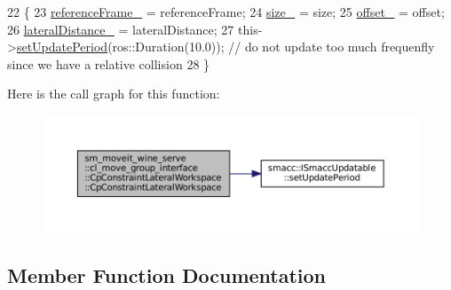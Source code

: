 \begin{DoxyCode}
22         \{
23             \hyperlink{classsm__moveit__wine__serve_1_1cl__move__group__interface_1_1CpConstraintLateralWorkspace_ae894b75a0860067b5a6bf372d77c6288}{referenceFrame\_} = referenceFrame;
24             \hyperlink{classsm__moveit__wine__serve_1_1cl__move__group__interface_1_1CpConstraintLateralWorkspace_ac86436171b9f9a7890c197b7ae1ab94b}{size\_} = size;
25             \hyperlink{classsm__moveit__wine__serve_1_1cl__move__group__interface_1_1CpConstraintLateralWorkspace_ac6bac0069cd6e3267af22bfc5c28ccb5}{offset\_} = offset;
26             \hyperlink{classsm__moveit__wine__serve_1_1cl__move__group__interface_1_1CpConstraintLateralWorkspace_ad907ce3091bcb999c40024c7049483ae}{lateralDistance\_} = lateralDistance;
27             this->\hyperlink{classsmacc_1_1ISmaccUpdatable_a88f3b092a81b2d8810a9776c8c69855b}{setUpdatePeriod}(ros::Duration(10.0)); \textcolor{comment}{// do not update too much frequenfly
       since we have a relative collision}
28         \}
\end{DoxyCode}
Here is the call graph for this function\+:
\nopagebreak
\begin{figure}[H]
\begin{center}
\leavevmode
\includegraphics[width=350pt]{classsm__moveit__wine__serve_1_1cl__move__group__interface_1_1CpConstraintLateralWorkspace_abf58ad942605893fd6b76c21c8dcbae1_cgraph}
\end{center}
\end{figure}


\subsection{Member Function Documentation}
\mbox{\label{classsm__moveit__wine__serve_1_1cl__move__group__interface_1_1CpConstraintLateralWorkspace_aaf957d5bea4855b8a7328479d971e5d1}} 
